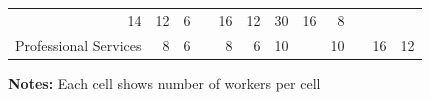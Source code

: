 \documentclass{article}
\begin{document}
\begin{table}[htbp]
\begin{threeparttable}
\begin{tabular}{llllllllllll}
  \multicolumn{1}{r}{14} &
  \multicolumn{1}{r}{12} &
  \multicolumn{1}{r}{6} &
  \multicolumn{1}{r}{} &
  \multicolumn{1}{r}{16} &
  \multicolumn{1}{r}{12} &
  \multicolumn{1}{r}{30} &
  \multicolumn{1}{r}{16} &
  \multicolumn{1}{r}{8} \\
\multicolumn{1}{l}{Professional Services} &
  \multicolumn{1}{r}{8} &
  \multicolumn{1}{r}{6} &
  \multicolumn{1}{r}{} &
  \multicolumn{1}{r}{8} &
  \multicolumn{1}{r}{6} &
  \multicolumn{1}{r}{10} &
  \multicolumn{1}{r}{} &
  \multicolumn{1}{r}{10} &
  \multicolumn{1}{r}{} &
  \multicolumn{1}{r}{16} &
  \multicolumn{1}{r}{12} \\
\bottomrule
\end{tabular}

 \footnotesize  
\textbf{Notes:} Each cell shows number of workers per cell 
\end{threeparttable} 
\end{table}
\end{document}
